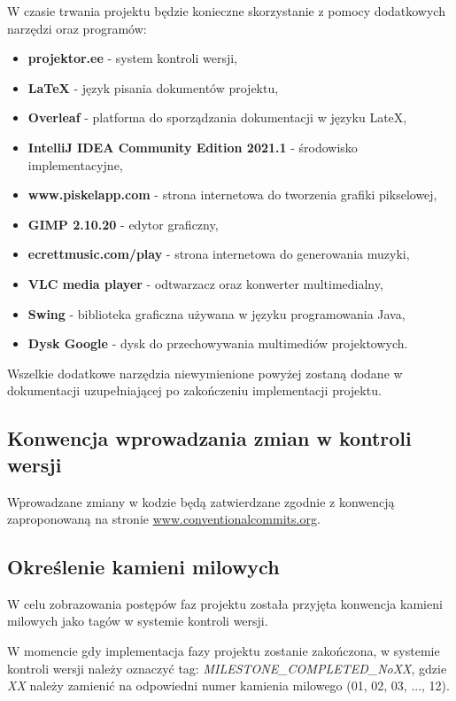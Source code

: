 \documentclass[a4paper]{article}
\begin{document}
\quad W czasie trwania projektu b\k{e}dzie konieczne skorzystanie z pomocy dodatkowych narz\k{e}dzi oraz program\'ow:

\begin{itemize}
    \item \textbf{projektor.ee} - system kontroli wersji,
    \item \textbf{LaTeX} - j\k{e}zyk pisania dokument\'ow projektu,
    \item \textbf{Overleaf} - platforma do sporz\k{a}dzania dokumentacji w j\k{e}zyku LateX,
    \item \textbf{IntelliJ IDEA Community Edition 2021.1} - \'srodowisko implementacyjne,
    \item \textbf{www.piskelapp.com} - strona internetowa do tworzenia grafiki pikselowej,
    \item \textbf{GIMP 2.10.20} - edytor graficzny,
    \item \textbf{ecrettmusic.com/play} - strona internetowa do generowania muzyki,
    \item \textbf{VLC media player} - odtwarzacz oraz konwerter multimedialny,
    \item \textbf{Swing} - biblioteka graficzna u\.zywana w j\k{e}zyku programowania Java,
    \item \textbf{Dysk Google} - dysk do przechowywania multimedi\'ow projektowych.
\end{itemize}


Wszelkie dodatkowe narz\k{e}dzia niewymienione powy\.zej zostan\k{a} dodane w dokumentacji uzupe\l{}niaj\k{a}cej po zako\'nczeniu implementacji projektu.

\subsection{Konwencja wprowadzania zmian w kontroli wersji}
\quad Wprowadzane zmiany w kodzie b\k{e}d\k{a} zatwierdzane zgodnie z konwencj\k{a} zaproponowan\k{a} na stronie \href{https://www.conventionalcommits.org/en/v1.0.0}{www.conventionalcommits.org}.

\subsection{Okre\'slenie kamieni milowych}

\quad W celu zobrazowania post\k{e}p\'ow faz projektu zosta\l{}a przyj\k{e}ta konwencja kamieni milowych jako tag\'ow w systemie kontroli wersji.

W momencie gdy implementacja fazy projektu zostanie zako\'nczona, w systemie kontroli wersji nale\.zy oznaczy\'c tag: \textit{MILESTONE\_COMPLETED\_NoXX},
gdzie \textit{XX} nale\.zy zamieni\'c na odpowiedni numer kamienia milowego (01, 02, 03, ..., 12).
\end{document}
